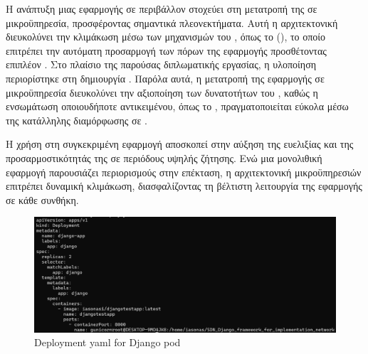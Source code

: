 Η ανάπτυξη μιας εφαρμογής σε περιβάλλον  στοχεύει στη μετατροπή της σε μικροϋπηρεσία, προσφέροντας σημαντικά πλεονεκτήματα. Αυτή η αρχιτεκτονική διευκολύνει την κλιμάκωση μέσω των μηχανισμών του , όπως το  (), το οποίο επιτρέπει την αυτόματη προσαρμογή των πόρων της εφαρμογής προσθέτοντας επιπλέον . Στο πλαίσιο της παρούσας διπλωματικής εργασίας, η υλοποίηση περιορίστηκε στη δημιουργία . Παρόλα αυτά, η μετατροπή της εφαρμογής σε μικροϋπηρεσία διευκολύνει την αξιοποίηση των δυνατοτήτων του , καθώς η ενσωμάτωση οποιουδήποτε αντικειμένου, όπως το , πραγματοποιείται εύκολα μέσω της κατάλληλης διαμόρφωσης σε .

Η χρήση  στη συγκεκριμένη εφαρμογή αποσκοπεί στην αύξηση της ευελιξίας και της προσαρμοστικότητάς της σε περιόδους υψηλής ζήτησης. Ενώ μια μονολιθική εφαρμογή παρουσιάζει περιορισμούς στην επέκταση, η αρχιτεκτονική μικροϋπηρεσιών επιτρέπει δυναμική κλιμάκωση, διασφαλίζοντας τη βέλτιστη λειτουργία της εφαρμογής σε κάθε συνθήκη.

\FloatBarrier

\begin{figure}[h]
	\centering
	\includegraphics[width=1.0\textwidth]{graphics/kubernetes_use_case.png}
	\caption{{Deployment yaml for Django pod} }
\end{figure}